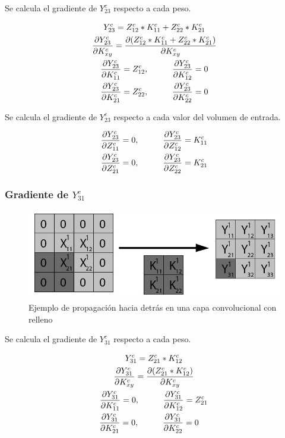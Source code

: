 Se calcula el gradiente de $Y^c_{23}$ respecto a cada peso.

\begin{gather}
	Y^c_{23} = Z^c_{12} * K^c_{11} + Z^c_{22} * K^c_{21} \\
	\frac{\partial Y^c_{23}}{\partial K^c_{xy}} = \frac{\partial (Z^c_{12} * K^c_{11} + Z^c_{22} * K^c_{21})}{\partial K^c_{xy}} \\
	\frac{\partial Y^c_{23}}{\partial K^c_{11}} = Z^c_{12}, \hspace{10mm} \frac{\partial Y^c_{23}}{\partial K^c_{12}} = 0 \\
	\frac{\partial Y^c_{23}}{\partial K^c_{21}} = Z^c_{22}, \hspace{10mm} \frac{\partial Y^c_{23}}{\partial K^c_{22}} = 0
\end{gather}

Se calcula el gradiente de $Y^c_{23}$ respecto a cada valor del volumen de entrada.

\begin{gather}
	\frac{\partial Y^c_{23}}{\partial Z^c_{11}} = 0, \hspace{10mm} \frac{\partial Y^c_{23}}{\partial Z^c_{12}} = K^c_{11}\\
	\frac{\partial Y^c_{23}}{\partial Z^c_{21}} = 0, \hspace{10mm} \frac{\partial Y^c_{23}}{\partial Z^c_{22}} = K^c_{21}
\end{gather}

\subsubsection{Gradiente de $Y^c_{31}$}

\begin{figure}[H]
	\centering
	\includegraphics[width=0.8\linewidth]{imagenes/conv_back_padding_7.jpg} 
	\caption{Ejemplo de propagación hacia detrás en una capa convolucional con relleno}
\end{figure}

Se calcula el gradiente de $Y^c_{31}$ respecto a cada peso.

\begin{gather}
	Y^c_{31} = Z^c_{21} * K^c_{12} \\
	\frac{\partial Y^c_{31}}{\partial K^c_{xy}} = \frac{\partial (Z^c_{21} * K^c_{12})}{\partial K^c_{xy}} \\
	\frac{\partial Y^c_{31}}{\partial K^c_{11}} = 0, \hspace{10mm} \frac{\partial Y^c_{31}}{\partial K^c_{12}} = Z^c_{21} \\
	\frac{\partial Y^c_{31}}{\partial K^c_{21}} = 0, \hspace{10mm} \frac{\partial Y^c_{31}}{\partial K^c_{22}} = 0 \hspace{4mm}
\end{gather}

